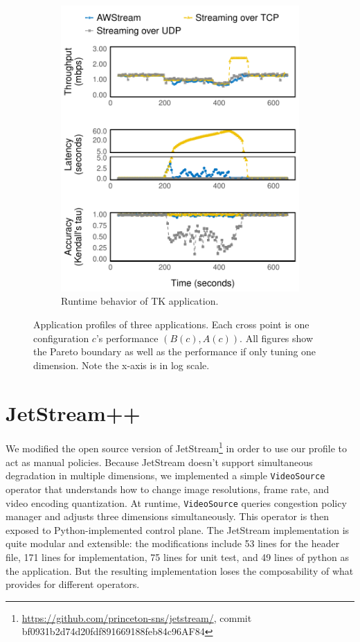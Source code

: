 \begin{figure}[htb]
\begin{subfigure}[t]{0.45\textwidth}
    \includegraphics[width=\columnwidth]{figures/runtime-topk-verticle.pdf}
    \caption{Runtime behavior of TK application.}
    \label{fig:tk-runtime}
  \end{subfigure}
  \caption{Application profiles of three applications. Each cross point is one
    configuration $c$'s performance $(B(c), A(c))$. All figures show the Pareto
    boundary as well as the performance if only tuning one dimension. Note the
    x-axis is in log scale.}
  \label{fig:all-profiles}
\end{figure}

\section{JetStream++}
\label{appendix:jetstream++}

We modified the open source version of
JetStream\footnote{\url{https://github.com/princeton-sns/jetstream/}, commit
  bf0931b2d74d20fdf891669188feb84c96AF84} in order to use our profile to act as
manual policies. Because JetStream doesn't support simultaneous degradation in
multiple dimensions, we implemented a simple \texttt{VideoSource} operator that
understands how to change image resolutions, frame rate, and video encoding
quantization. At runtime, \texttt{VideoSource} queries congestion policy manager
and adjusts three dimensions simultaneously. This operator is then exposed to
Python-implemented control plane. The JetStream implementation is quite modular
and extensible: the modifications include 53 lines for the header file, 171
lines for implementation, 75 lines for unit test, and 49 lines of python as the
application. But the resulting implementation loses the composability of what
\sysname{} provides for different operators.

